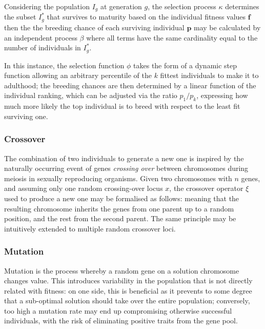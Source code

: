 Considering the population $I_g$ at generation $g$, the selection process $\kappa$ determines the subset $I_g^*$ that survives to maturity based on the individual fitness values $\mathbf{f}$
then the the breeding chance of each surviving individual $\mathbf{p}$ may be calculated by an independent process $\beta$
where all terms have the same cardinality equal to the number of individuals in $I_g^*$.

In this instance, the selection function $\phi$ takes the form of a dynamic step function allowing an arbitrary percentile of the $k$ fittest individuals to make it to adulthood; the breeding chances are then determined by a linear function of the individual ranking, which can be adjusted via the ratio $p_1 / p_k$, expressing how much more likely the top individual is to breed with respect to the least fit surviving one.

\subsubsection{Crossover}
The combination of two individuals to generate a new one is inspired by the naturally occurring event of genes \emph{crossing over} between chromosomes during meiosis in sexually reproducing organisms.
Given two chromosomes with $n$ genes, and assuming only one random crossing-over locus $x$, the crossover operator $\xi$ used to produce a new one may be formalised as follows:
meaning that the resulting chromosome inherits the genes from one parent up to a random position, and the rest from the second parent. The same principle may be intuitively extended to multiple random crossover loci.

\subsubsection{Mutation}
Mutation is the process whereby a random gene on a solution chromosome changes value.
This introduces variability in the population that is not directly related with fitness: on one side, this is beneficial as it prevents to some degree that a sub-optimal solution should take over the entire population; conversely, too high a mutation rate may end up compromising otherwise successful individuals, with the risk of eliminating positive traits from the gene pool.

